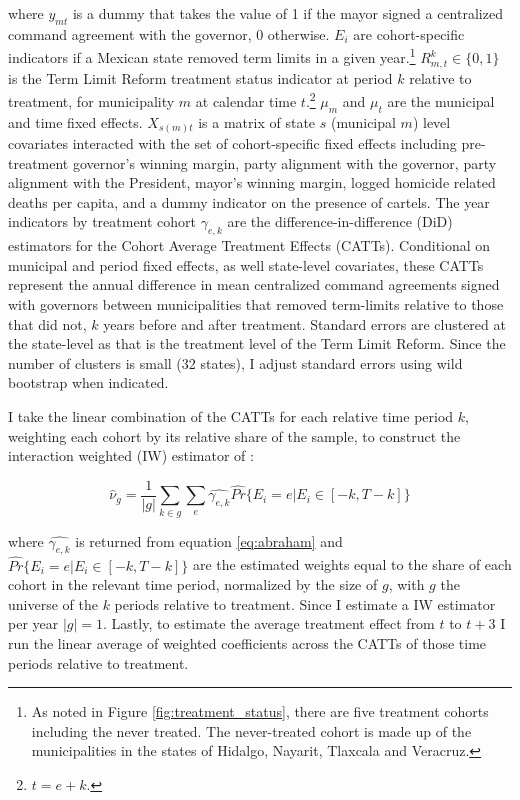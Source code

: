 \documentclass[12pt]{amsart}
\numberwithin{equation}{section}
\theoremstyle{definition}
\theoremstyle{definition}
\theoremstyle{definition}
\begin{document}
where $y_{mt}$ is a dummy that takes the value of 1 if the mayor signed a centralized command agreement with the governor, 0 otherwise. $E_i$ are cohort-specific indicators if a Mexican state removed term limits in a given year.\footnote{As noted in Figure \ref{fig:treatment_status}, there are five treatment cohorts including the never treated. The never-treated cohort is made up of the municipalities in the states of Hidalgo, Nayarit, Tlaxcala and Veracruz.} $R^k_{m,t}\in \{0,1\}$  is the Term Limit Reform treatment status indicator at period $k$ relative to treatment, for municipality $m$ at calendar time $t$.\footnote{$t=e+k$.} $\mu_m$ and $\mu_t$ are the municipal and time fixed effects. $X_{s(m)t}$ is a matrix of state $s$ (municipal $m$) level covariates interacted with the set of cohort-specific fixed effects including pre-treatment governor's winning margin, party alignment with the governor, party alignment with the President, mayor's winning margin, logged homicide related deaths per capita, and a dummy indicator on the presence of cartels.  The year indicators by treatment cohort  $\gamma_{e,k}$ are the difference-in-difference (DiD) estimators for the Cohort Average Treatment Effects (CATTs). Conditional on municipal and period fixed effects, as well state-level covariates, these CATTs represent the annual difference in mean centralized command agreements signed with governors between municipalities that removed term-limits relative to those that did not, $k$ years before and after treatment. Standard errors are clustered at the state-level as that is the treatment level of the Term Limit Reform. Since the number of clusters is small (32 states), I adjust standard errors using wild bootstrap when indicated. 

I take the linear combination of the CATTs for each relative time period $k$, weighting each cohort by its relative share of the sample, to construct the interaction weighted (IW) estimator of \citet{abraham_sun_2020}:   

\begin{equation}
\hat{\nu}_g=\frac{1}{|g|}\sum_{k \in g}\sum_e \hat{\gamma_{e,k}} \hat{Pr}\{E_i=e | E_i \in [-k, T-k]\}	
\end{equation}

where $\hat{\gamma_{e,k}}$ is returned from equation \ref{eq:abraham} and $\hat{Pr}\{E_i=e | E_i \in [-k, T-k]\}$  are the estimated weights equal to the share of each cohort in the relevant time period, normalized by the size of  $g$, with $g$ the universe of the $k$ periods relative to treatment. Since I estimate a IW estimator per year $|g|=1$. Lastly, to estimate the average treatment effect from $t$ to $t+3$ I run the linear average of weighted coefficients across the CATTs of those time periods relative to treatment. 
\end{document}
